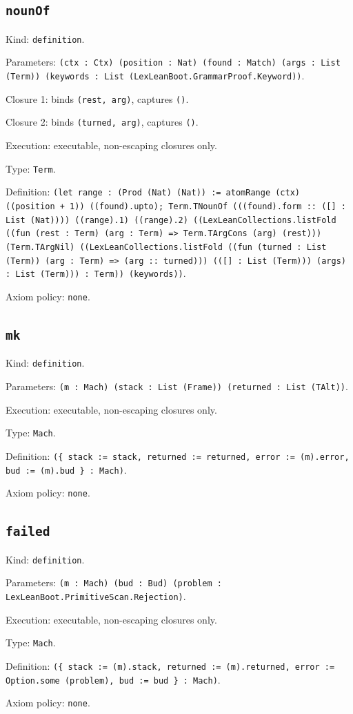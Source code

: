 \documentclass[11pt]{article}
\begin{document}
\subsection*{\texttt{nounOf}}
\noindent Kind: \texttt{definition}.\par
\noindent Parameters: \texttt{(ctx : Ctx) (position : Nat) (found : Match) (args : List (Term)) (keywords : List (LexLeanBoot.GrammarProof.Keyword))}.\par
\noindent Closure 1: binds \texttt{(rest, arg)}, captures \texttt{()}.\par
\noindent Closure 2: binds \texttt{(turned, arg)}, captures \texttt{()}.\par
\noindent Execution: executable, non-escaping closures only.\par
\noindent Type: \texttt{Term}.\par
\noindent Definition: \texttt{(let range : (Prod (Nat) (Nat)) := atomRange (ctx) ((position + 1)) ((found).upto); Term.TNounOf (((found).form :: ([] : List (Nat)))) ((range).1) ((range).2) ((LexLeanCollections.listFold ((fun (rest : Term) (arg : Term) => Term.TArgCons (arg) (rest))) (Term.TArgNil) ((LexLeanCollections.listFold ((fun (turned : List (Term)) (arg : Term) => (arg :: turned))) (([] : List (Term))) (args) : List (Term))) : Term)) (keywords))}.\par
\noindent Axiom policy: \texttt{none}.\par
\subsection*{\texttt{mk}}
\noindent Kind: \texttt{definition}.\par
\noindent Parameters: \texttt{(m : Mach) (stack : List (Frame)) (returned : List (TAlt))}.\par
\noindent Execution: executable, non-escaping closures only.\par
\noindent Type: \texttt{Mach}.\par
\noindent Definition: \texttt{(\{ stack := stack, returned := returned, error := (m).error, bud := (m).bud \} : Mach)}.\par
\noindent Axiom policy: \texttt{none}.\par
\subsection*{\texttt{failed}}
\noindent Kind: \texttt{definition}.\par
\noindent Parameters: \texttt{(m : Mach) (bud : Bud) (problem : LexLeanBoot.PrimitiveScan.Rejection)}.\par
\noindent Execution: executable, non-escaping closures only.\par
\noindent Type: \texttt{Mach}.\par
\noindent Definition: \texttt{(\{ stack := (m).stack, returned := (m).returned, error := Option.some (problem), bud := bud \} : Mach)}.\par
\noindent Axiom policy: \texttt{none}.\par
\end{document}
